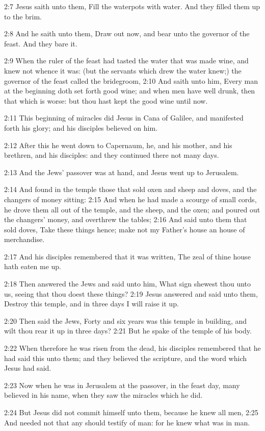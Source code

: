 2:7 Jesus saith unto them, Fill the waterpots with water. And they
filled them up to the brim.

2:8 And he saith unto them, Draw out now, and bear unto the governor
of the feast. And they bare it.

2:9 When the ruler of the feast had tasted the water that was made
wine, and knew not whence it was: (but the servants which drew the
water knew;) the governor of the feast called the bridegroom, 2:10 And
saith unto him, Every man at the beginning doth set forth good wine;
and when men have well drunk, then that which is worse: but thou hast
kept the good wine until now.

2:11 This beginning of miracles did Jesus in Cana of Galilee, and
manifested forth his glory; and his disciples believed on him.

2:12 After this he went down to Capernaum, he, and his mother, and his
brethren, and his disciples: and they continued there not many days.

2:13 And the Jews' passover was at hand, and Jesus went up to
Jerusalem.

2:14 And found in the temple those that sold oxen and sheep and doves,
and the changers of money sitting: 2:15 And when he had made a scourge
of small cords, he drove them all out of the temple, and the sheep,
and the oxen; and poured out the changers' money, and overthrew the
tables; 2:16 And said unto them that sold doves, Take these things
hence; make not my Father's house an house of merchandise.

2:17 And his disciples remembered that it was written, The zeal of
thine house hath eaten me up.

2:18 Then answered the Jews and said unto him, What sign shewest thou
unto us, seeing that thou doest these things?  2:19 Jesus answered and
said unto them, Destroy this temple, and in three days I will raise it
up.

2:20 Then said the Jews, Forty and six years was this temple in
building, and wilt thou rear it up in three days?  2:21 But he spake
of the temple of his body.

2:22 When therefore he was risen from the dead, his disciples
remembered that he had said this unto them; and they believed the
scripture, and the word which Jesus had said.

2:23 Now when he was in Jerusalem at the passover, in the feast day,
many believed in his name, when they saw the miracles which he did.

2:24 But Jesus did not commit himself unto them, because he knew all
men, 2:25 And needed not that any should testify of man: for he knew
what was in man.

